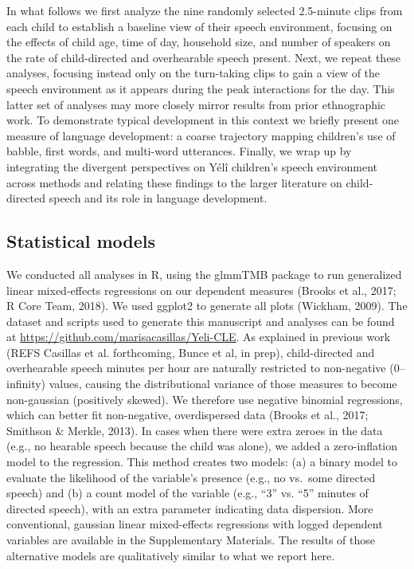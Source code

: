 \documentclass[,man,floatsintext]{apa6}
\begin{document}
In what follows we first analyze the nine randomly selected 2.5-minute
clips from each child to establish a baseline view of their speech
environment, focusing on the effects of child age, time of day,
household size, and number of speakers on the rate of child-directed and
overhearable speech present. Next, we repeat these analyses, focusing
instead only on the turn-taking clips to gain a view of the speech
environment as it appears during the peak interactions for the day. This
latter set of analyses may more closely mirror results from prior
ethnographic work. To demonstrate typical development in this context we
briefly present one measure of language development: a coarse trajectory
mapping children's use of babble, first words, and multi-word
utterances. Finally, we wrap up by integrating the divergent
perspectives on Yélî children's speech environment across methods and
relating these findings to the larger literature on child-directed
speech and its role in language development.

\subsection{Statistical models}\label{statistical-models}

We conducted all analyses in R, using the glmmTMB package to run
generalized linear mixed-effects regressions on our dependent measures
(Brooks et al., 2017; R Core Team, 2018). We used ggplot2 to generate
all plots (Wickham, 2009). The dataset and scripts used to generate this
manuscript and analyses can be found at
\url{https://github.com/marisacasillas/Yeli-CLE}. As explained in
previous work (REFS Casillas et al. forthcoming, Bunce et al, in prep),
child-directed and overhearable speech minutes per hour are naturally
restricted to non-negative (0--infinity) values, causing the
distributional variance of those measures to become non-gaussian
(positively skewed). We therefore use negative binomial regressions,
which can better fit non-negative, overdispersed data (Brooks et al.,
2017; Smithson \& Merkle, 2013). In cases when there were extra zeroes
in the data (e.g., no hearable speech because the child was alone), we
added a zero-inflation model to the regression. This method creates two
models: (a) a binary model to evaluate the likelihood of the variable's
presence (e.g., no vs.~some directed speech) and (b) a count model of
the variable (e.g., \enquote{3} vs. \enquote{5} minutes of directed
speech), with an extra parameter indicating data dispersion. More
conventional, gaussian linear mixed-effects regressions with logged
dependent variables are available in the Supplementary Materials. The
results of those alternative models are qualitatively similar to what we
report here.
\end{document}
